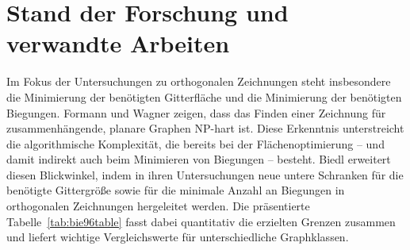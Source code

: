 \documentclass[bachelor, german]{algothesis}
\begin{document}
\section{Stand der Forschung und verwandte Arbeiten}
Im Fokus der Untersuchungen zu orthogonalen Zeichnungen steht insbesondere die Minimierung der benötigten Gitterfläche und die Minimierung der benötigten Biegungen. Formann und Wagner \cite{NP-orth} zeigen, dass das Finden einer  Zeichnung für zusammenhängende, planare Graphen NP-hart ist. Diese Erkenntnis unterstreicht die algorithmische Komplexität, die bereits bei der Flächenoptimierung – und damit indirekt auch beim Minimieren von Biegungen – besteht.\newline
Biedl \cite{Biedl} erweitert diesen Blickwinkel, indem in ihren Untersuchungen neue untere Schranken für die benötigte Gittergröße sowie für die minimale Anzahl an Biegungen in orthogonalen Zeichnungen hergeleitet werden. Die präsentierte Tabelle~\ref{tab:bie96table} fasst dabei quantitativ die erzielten Grenzen zusammen und liefert wichtige Vergleichswerte für unterschiedliche Graphklassen.
\begin{table}[H]
\centering
{}
\caption{Untere Schranken für orthogonale Darstellungen. Ein '–' zeigt an, dass dieser Fall unmöglich ist, während ein '?' darauf hinweist, dass keine besseren unteren Schranken als im Fall zusammenhängender Graphen gefunden wurden\protect\footnotemark}
\label{tab:bie96table}
\end{table}
\end{document}
